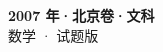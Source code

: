\documentclass[zihao=-4, a4paper]{ctexart}
\begin{document}
\begin{center}
  {\Large\bfseries 2007 年·北京卷·文科}\\[4pt]
  {\large 数学 · 试题版}
\end{center}
\medskip
{}

\end{document}
